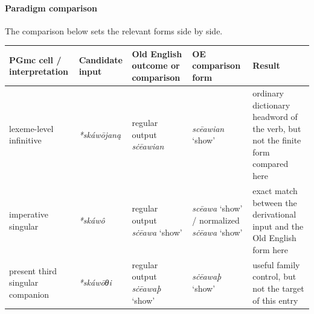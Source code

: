 \documentclass[
  british,
  a4paper,
]{article}
\newcounter{none} %
\begin{document}
\paragraph{Paradigm comparison}\label{paradigm-comparison-25}

The comparison below sets the relevant forms side by side.

{\def\LTcaptype{none} %
\begin{longtable}[]{@{}
  >{\raggedright\arraybackslash}p{}
  >{\raggedright\arraybackslash}p{}
  >{\raggedright\arraybackslash}p{}
  >{\raggedright\arraybackslash}p{}
  >{\raggedright\arraybackslash}p{}@{}}
\toprule\noalign{}
\begin{minipage}[b]{\linewidth}\raggedright
PGmc cell / interpretation
\end{minipage} & \begin{minipage}[b]{\linewidth}\raggedright
Candidate input
\end{minipage} & \begin{minipage}[b]{\linewidth}\raggedright
Old English outcome or comparison
\end{minipage} & \begin{minipage}[b]{\linewidth}\raggedright
OE comparison form
\end{minipage} & \begin{minipage}[b]{\linewidth}\raggedright
Result
\end{minipage} \\
\midrule\noalign{}
\endhead
\bottomrule\noalign{}
\endlastfoot
lexeme-level infinitive & {\emph{*skáwōjaną}} & regular output
{\emph{sċēawian}} & {\emph{scēawian}} `show' & ordinary dictionary
headword of the verb, but not the finite form compared here \\
imperative singular & {\emph{*skáwô}} & regular output {\emph{sċēawa}}
`show' & {\emph{scēawa}} `show' / normalized {\emph{sċēawa}} `show' &
exact match between the derivational input and the Old English form
here \\
present third singular companion & {\emph{*skáwōθi}} & regular output
{\emph{sċēawaþ}} `show' & {\emph{sċēawaþ}} `show' & useful family
control, but not the target of this entry \\
\end{longtable}
}
\end{document}
